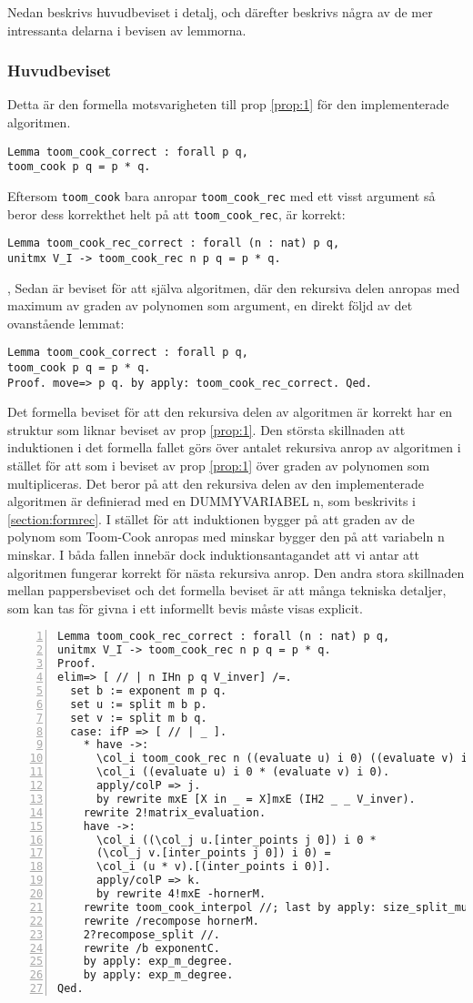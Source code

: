 Nedan beskrivs huvudbeviset i detalj, och därefter beskrivs några av de mer
intressanta delarna i bevisen av lemmorna.

\subsubsection{Huvudbeviset}
Detta är den formella motsvarigheten till prop \ref{prop:1} för den
implementerade algoritmen.
\begin{verbatim}
Lemma toom_cook_correct : forall p q,
toom_cook p q = p * q.
\end{verbatim}
Eftersom \verb+toom_cook+ bara anropar \verb+toom_cook_rec+ med ett visst
argument så beror dess korrekthet helt på att \verb+toom_cook_rec+, är korrekt:
\begin{verbatim}
Lemma toom_cook_rec_correct : forall (n : nat) p q,
unitmx V_I -> toom_cook_rec n p q = p * q.
\end{verbatim},
Sedan är beviset för att själva algoritmen, där den rekursiva delen anropas med
maximum av graden av polynomen som argument, en direkt följd av det ovanstående
lemmat:
\begin{verbatim}
Lemma toom_cook_correct : forall p q,
toom_cook p q = p * q.
Proof. move=> p q. by apply: toom_cook_rec_correct. Qed.
\end{verbatim}
Det formella beviset för att den rekursiva delen av algoritmen är korrekt har
en struktur som liknar beviset av prop \ref{prop:1}. Den största skillnaden att
induktionen i det formella fallet görs över antalet rekursiva anrop av
algoritmen i stället för att som i beviset av prop \ref{prop:1} över graden av
polynomen som multipliceras. Det beror på att den rekursiva delen av den
implementerade algoritmen är definierad med en DUMMYVARIABEL n, som beskrivits
i \ref{section:formrec}. I stället för att induktionen bygger på att graden av
de polynom som Toom-Cook anropas med minskar bygger den på att variabeln n
minskar. I båda fallen innebär dock induktionsantagandet att vi antar att
algoritmen fungerar korrekt för nästa rekursiva anrop. Den andra stora
skillnaden mellan pappersbeviset och det formella beviset är att många tekniska
detaljer, som kan tas för givna i ett informellt bevis måste visas explicit.
\begin{Verbatim}[numbers=left]
Lemma toom_cook_rec_correct : forall (n : nat) p q,
unitmx V_I -> toom_cook_rec n p q = p * q.
Proof.
elim=> [ // | n IHn p q V_inver] /=.
  set b := exponent m p q.
  set u := split m b p.
  set v := split m b q.
  case: ifP => [ // | _ ].
    * have ->:
      \col_i toom_cook_rec n ((evaluate u) i 0) ((evaluate v) i 0) =
      \col_i ((evaluate u) i 0 * (evaluate v) i 0).
      apply/colP => j.
      by rewrite mxE [X in _ = X]mxE (IH2 _ _ V_inver).
    rewrite 2!matrix_evaluation.
    have ->:
      \col_i ((\col_j u.[inter_points j 0]) i 0 *
      (\col_j v.[inter_points j 0]) i 0) =
      \col_i (u * v).[(inter_points i 0)].
      apply/colP => k.
      by rewrite 4!mxE -hornerM.
    rewrite toom_cook_interpol //; last by apply: size_split_mul.
    rewrite /recompose hornerM.
    2?recompose_split //.
    rewrite /b exponentC.
    by apply: exp_m_degree.
    by apply: exp_m_degree.
Qed.
\end{Verbatim}
